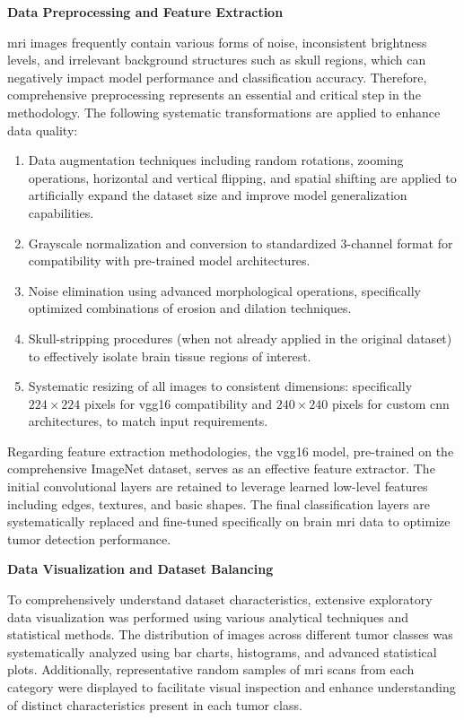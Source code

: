 \textbf{Data Preprocessing and Feature Extraction}

\gls{mri} images frequently contain various forms of noise, inconsistent brightness levels, and irrelevant background structures such as skull regions, which can negatively impact model performance and classification accuracy. Therefore, comprehensive preprocessing represents an essential and critical step in the methodology. The following systematic transformations are applied to enhance data quality:

\begin{enumerate}[label=\roman*.]
    \item Data augmentation techniques including random rotations, zooming operations,
          horizontal and vertical flipping, and spatial shifting are applied to
          artificially expand the dataset size and improve model generalization
          capabilities.
    \item Grayscale normalization and conversion to standardized 3-channel format for
          compatibility with pre-trained model architectures.
    \item Noise elimination using advanced morphological operations, specifically
          optimized combinations of erosion and dilation techniques.
    \item Skull-stripping procedures (when not already applied in the original dataset)
          to effectively isolate brain tissue regions of interest.
    \item Systematic resizing of all images to consistent dimensions: specifically $224
              \times 224$ pixels for \gls{vgg16} compatibility and $240 \times 240$ pixels
          for custom \gls{cnn} architectures, to match input requirements.
\end{enumerate}

Regarding feature extraction methodologies, the \gls{vgg16} model, pre-trained
on the comprehensive ImageNet dataset, serves as an effective feature
extractor. The initial convolutional layers are retained to leverage learned
low-level features including edges, textures, and basic shapes. The final
classification layers are systematically replaced and fine-tuned specifically
on brain \gls{mri} data to optimize tumor detection performance.

\textbf{Data Visualization and Dataset Balancing}

To comprehensively understand dataset characteristics, extensive exploratory
data visualization was performed using various analytical techniques and
statistical methods. The distribution of images across different tumor classes
was systematically analyzed using bar charts, histograms, and advanced
statistical plots. Additionally, representative random samples of \gls{mri}
scans from each category were displayed to facilitate visual inspection and
enhance understanding of distinct characteristics present in each tumor class.

